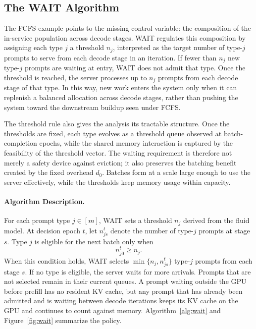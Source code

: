 \subsection{The WAIT Algorithm}
\label{subsec:wait_algorithm}

The FCFS example points to the missing control variable: the composition of the in-service population across decode stages. WAIT regulates this composition by assigning each type \(j\) a threshold \(n_j\), interpreted as the target number of type-\(j\) prompts to serve from each decode stage in an iteration. If fewer than \(n_j\) new type-\(j\) prompts are waiting at entry, WAIT does not admit that type. Once the threshold is reached, the server processes up to \(n_j\) prompts from each decode stage of that type. In this way, new work enters the system only when it can replenish a balanced allocation across decode stages, rather than pushing the system toward the downstream buildup seen under FCFS.

The threshold rule also gives the analysis its tractable structure. Once the thresholds are fixed, each type evolves as a threshold queue observed at batch-completion epochs, while the shared memory interaction is captured by the feasibility of the threshold vector. The waiting requirement is therefore not merely a safety device against eviction; it also preserves the batching benefit created by the fixed overhead \(d_0\). Batches form at a scale large enough to use the server effectively, while the thresholds keep memory usage within capacity.

\paragraph{Algorithm Description.} For each prompt type \(j \in [m]\), WAIT sets a threshold \(n_j\) derived from the fluid model. At decision epoch \(t\), let \(n_{js}^t\) denote the number of type-\(j\) prompts at stage \(s\). Type \(j\) is eligible for the next batch only when
\[
n_{j0}^t \geq n_j.
\]
When this condition holds, WAIT selects \(\min\{n_j,n_{js}^t\}\) type-\(j\) prompts from each stage \(s\). If no type is eligible, the server waits for more arrivals. Prompts that are not selected remain in their current queues. A prompt waiting outside the GPU before prefill has no resident KV cache, but any prompt that has already been admitted and is waiting between decode iterations keeps its KV cache on the GPU and continues to count against memory. Algorithm~\ref{alg:wait} and Figure~\ref{fig:wait} summarize the policy.

